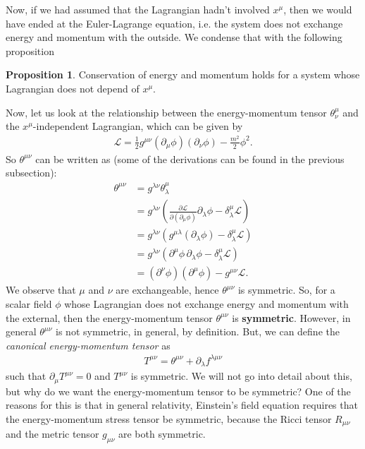 \documentclass[a4paper,11pt]{article}
\numberwithin{equation}{section}
\theoremstyle{definition}
\newtheorem{prop}{Proposition}[section]
\newcommand{\p}{\partial}
\newcommand{\lag}{\mathcal{L}}
\begin{document}
Now, if we had assumed that the Lagrangian hadn't involved $x^\mu$, then we would have ended at the Euler-Lagrange equation, i.e. the system does not exchange energy and momentum with the outside. We condense that with the following proposition

\begin{prop}
	Conservation of energy and momentum holds for a system whose Lagrangian does not depend of $x^\mu$.
\end{prop}

Now, let us look at the relationship between the energy-momentum tensor $\theta^\mu_\nu$ and the $x^\mu$-independent Lagrangian, which can be given by
\begin{align*}
\lag = \frac{1}{2}g^{\mu\nu}(\p_\mu\phi)(\p_\nu\phi) - \frac{m^2}{2}\phi^2.
\end{align*}
So $\theta^{\mu\nu}$ can be written as (some of the derivations can be found in the previous subsection):
\begin{align*}
\theta^{\mu\nu} &= g^{\lambda\nu}\theta^\mu_\lambda \\
&= g^{\lambda\nu}\left( \frac{\p\lag}{\p(\p_\mu\phi)}\p_\lambda\phi - \delta^\mu_\lambda\lag \right)\\
&= g^{\lambda\nu}(g^{\mu\lambda}(\p_\lambda\phi) - \delta^\mu_\lambda\lag)\\
&= g^{\lambda\nu}(\p^\mu\phi\,\p_\lambda\phi - \delta^\mu_\lambda\lag)\\
&= (\p^\nu\phi)(\p^\mu\phi) - g^{\mu\nu}\lag.
\end{align*}
We observe that $\mu$ and $\nu$ are exchangeable, hence $\theta^{\mu\nu}$ is symmetric. So, for a scalar field $\phi$ whose Lagrangian does not exchange energy and momentum with the external, then the energy-momentum tensor $\theta^{\mu\nu}$ is \textbf{symmetric}. However, in general $\theta^{\mu\nu}$ is not symmetric, in general, by definition. But, we can define the \textit{canonical energy-momentum tensor} as
\begin{align*}
T^{\mu\nu} = \theta^{\mu\nu} + \p_\lambda f^{\lambda\mu\nu}
\end{align*}
such that $\p_\mu T^{\mu\nu} = 0$ and $T^{\mu\nu}$ is symmetric. We will not go into detail about this, but why do we want the energy-momentum tensor to be symmetric? One of the reasons for this is that in general relativity, Einstein's field equation requires that the energy-momentum stress tensor be symmetric, because the Ricci tensor $R_{\mu\nu}$ and the metric tensor $g_{\mu\nu}$ are both symmetric.
\end{document}
